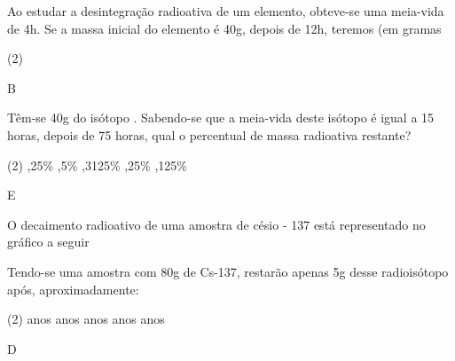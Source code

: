 \documentclass[9 pt]{scrartcl}
\begin{document}
\begin{exercise}[points=1.0]
Ao estudar a desintegração radioativa de um elemento, obteve-se uma meia-vida de 4h. Se a
massa inicial do elemento é 40g, depois de 12h, teremos (em gramas

\begin{choice}(2)
\end{choice}
\end{exercise}
\begin{solution}
B
\end{solution}


\begin{exercise}[points=1.0]
Têm-se 40g do isótopo . Sabendo-se que a meia-vida deste isótopo é igual a 15 horas,
depois de 75 horas, qual o percentual de massa radioativa restante?

\begin{choice}(2)
,25\%
,5\%
,3125\%
,25\%
,125\%
\end{choice}
\end{exercise}
\begin{solution}
E
\end{solution}





\begin{exercise}[points=1.0]
O decaimento radioativo de uma amostra de césio - 137 está representado no gráfico a seguir


\begin{center}
\end{center}

Tendo-se uma amostra com 80g de Cs-137, restarão apenas 5g desse radioisótopo após, aproximadamente:


\begin{choice}(2)
 anos
 anos
 anos
 anos
 anos
\end{choice}
\end{exercise}
\begin{solution}
D
\end{solution}
\end{document}
